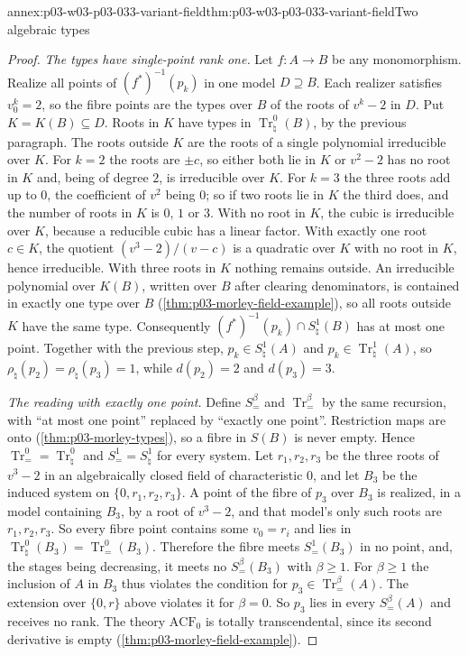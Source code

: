 \begin{annexitem}{annex:p03-w03-p03-033-variant-field}{thm:p03-w03-p03-033-variant-field}{Two algebraic types}
\begin{proof}
\emph{The types have single-point rank one.} Let \(f:A\to B\) be any
monomorphism. Realize all points of \((f^*)^{-1}(p_k)\) in one model
\(D\supseteq B\). Each realizer satisfies \(v_0^k=2\), so the fibre points
are the types over \(B\) of the roots of \(v^k-2\) in \(D\). Put
\(K=K(B)\subseteq D\). Roots in \(K\) have types in
\(\operatorname{Tr}_\natural^0(B)\), by the previous paragraph. The roots
outside \(K\) are the roots of a single polynomial irreducible over \(K\).
For \(k=2\) the roots are \(\pm c\), so either both lie in \(K\) or
\(v^2-2\) has no root in \(K\) and, being of degree \(2\), is irreducible
over \(K\). For \(k=3\) the three roots add up to \(0\), the coefficient
of \(v^2\) being \(0\); so if two roots lie in \(K\) the third does, and
the number of roots in \(K\) is \(0\), \(1\) or \(3\). With no root in
\(K\), the cubic is irreducible over \(K\), because a reducible cubic has
a linear factor. With exactly one root \(c\in K\), the quotient
\((v^3-2)/(v-c)\) is a quadratic over \(K\) with no root in \(K\), hence
irreducible. With three roots in \(K\) nothing remains outside. An
irreducible polynomial over \(K(B)\), written over \(B\) after clearing
denominators, is contained in exactly one type over \(B\)
(\cref{thm:p03-morley-field-example}), so all roots outside \(K\) have the
same type. Consequently
\((f^*)^{-1}(p_k)\cap S_\natural^1(B)\) has at most one point. Together
with the previous step, \(p_k\in S_\natural^1(A)\) and
\(p_k\in\operatorname{Tr}_\natural^1(A)\), so
\(\rho_\natural(p_2)=\rho_\natural(p_3)=1\), while \(d(p_2)=2\) and
\(d(p_3)=3\).

\emph{The reading with exactly one point.} Define
\(S_=^\beta\) and \(\operatorname{Tr}_=^\beta\) by the same recursion, with
``at most one point'' replaced by ``exactly one point''. Restriction maps
are onto (\cref{thm:p03-morley-types}), so a fibre in \(S(B)\) is never
empty. Hence \(\operatorname{Tr}_=^0=\operatorname{Tr}_\natural^0\) and
\(S_=^1=S_\natural^1\) for every system. Let \(r_1,r_2,r_3\) be the three
roots of \(v^3-2\) in an algebraically closed field of characteristic
\(0\), and let \(B_3\) be the induced system on \(\{0,r_1,r_2,r_3\}\). A
point of the fibre of \(p_3\) over \(B_3\) is realized, in a model
containing \(B_3\), by a root of \(v^3-2\), and that model's only such
roots are \(r_1,r_2,r_3\). So every fibre point contains some
\(v_0=r_i\) and lies in \(\operatorname{Tr}_\natural^0(B_3)=
\operatorname{Tr}_=^0(B_3)\). Therefore the fibre meets \(S_=^1(B_3)\) in
no point, and, the stages being decreasing, it meets no
\(S_=^\beta(B_3)\) with \(\beta\geq1\). For \(\beta\geq1\) the inclusion
of \(A\) in \(B_3\) thus violates the condition for
\(p_3\in\operatorname{Tr}_=^\beta(A)\). The extension over \(\{0,r\}\)
above violates it for \(\beta=0\). So \(p_3\) lies in every \(S_=^\beta(A)\)
and receives no rank. The theory \(\mathrm{ACF}_0\) is totally
transcendental, since its second derivative is empty
(\cref{thm:p03-morley-field-example}).
\end{proof}
\end{annexitem}

